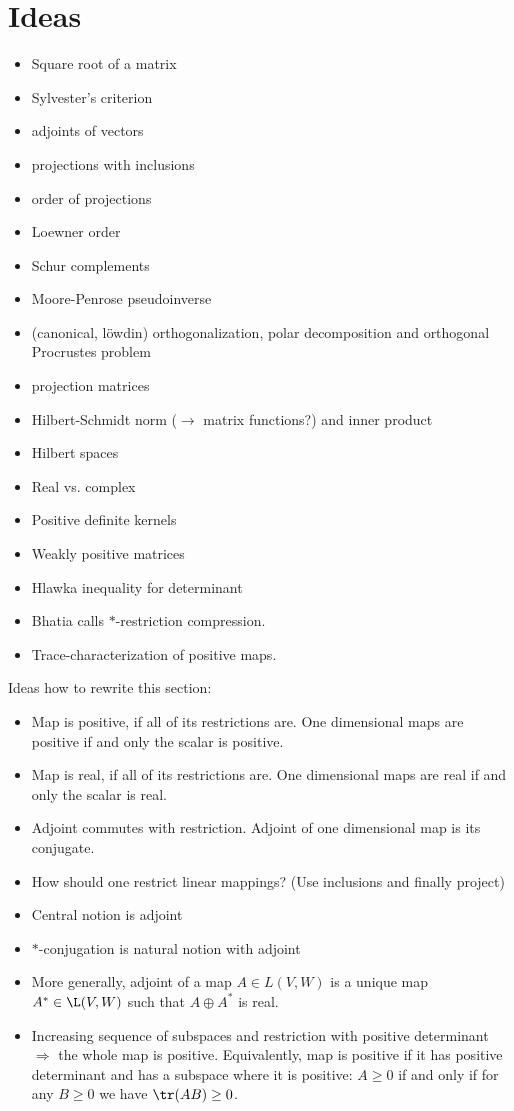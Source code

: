\section{Ideas}

\begin{itemize}
	\item Square root of a matrix
	\item Sylvester's criterion
	\item adjoints of vectors
	\item projections with inclusions
	\item order of projections
	\item Loewner order
	\item Schur complements
	\item Moore-Penrose pseudoinverse
	\item (canonical, löwdin) orthogonalization, polar decomposition and orthogonal Procrustes problem
	\item projection matrices
	\item Hilbert-Schmidt norm ($\to$ matrix functions?) and inner product
	\item Hilbert spaces
	\item Real vs. complex
	\item Positive definite kernels
	\item Weakly positive matrices
	\item Hlawka inequality for determinant %
	\item Bhatia calls $*$-restriction compression.
	\item Trace-characterization of positive maps.
\end{itemize}

Ideas how to rewrite this section:
\begin{itemize}
	\item Map is positive, if all of its restrictions are. One dimensional maps are positive if and only the scalar is positive.
	\item Map is real, if all of its restrictions are. One dimensional maps are real if and only the scalar is real.
	\item Adjoint commutes with restriction. Adjoint of one dimensional map is its conjugate.
	\item How should one restrict linear mappings? (Use inclusions and finally project)
	\item Central notion is adjoint
	\item $*$-conjugation is natural notion with adjoint
	\item More generally, adjoint of a map $A \in L(V, W)$ is a unique map $A^{*} \in \L(V, W)$ such that $A \oplus A^{*}$ is real.
	\item Increasing sequence of subspaces and restriction with positive determinant $\Rightarrow$ the whole map is positive. Equivalently, map is positive if it has positive determinant and has a subspace where it is positive: $A \geq 0$ if and only if for any $B \geq 0$ we have $\tr(A B) \geq 0$.
\end{itemize}





